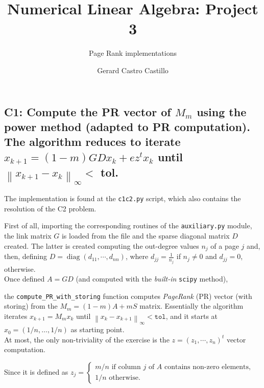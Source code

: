 \documentclass[12pt]{scrartcl}
\begin{document}

\title{Numerical Linear Algebra: Project 3}
\subtitle{Page Rank implementations}
\author{Gerard Castro Castillo}
\maketitle



\subsection*{C1: Compute the PR vector of $M_m$ using the power method (adapted to PR computation). The algorithm reduces to iterate $x_{k+1}=(1-m) G D x_k+e z^t x_k$ until $\left\|x_{k+1}-x_k\right\|_{\infty}<$ tol.}

The implementation is found at the \texttt{c1c2.py} script, which also contains the resolution of the C2 problem.

First of all, importing the corresponding routines of the \texttt{auxiliary.py} module, the link matrix $G$ is loaded from the file and the sparse diagonal matrix $D$ created. The latter is created computing the out-degree values $n_j$ of a page $j$ and, then, defining $D=\operatorname{diag}\left(d_{11}, \cdots, d_{n n}\right)$, where $d_{j j}=\frac{1}{n_j}$ if $n_j \neq 0$ and $d_{j j}=0$, otherwise.\\

Once defined $A=G D$ (and computed with the \textit{built-in} \texttt{scipy} method), 

the \texttt{compute\_{}PR\_{}with\_{}storing} function computes \textit{PageRank} (PR) vector (with storing) from the $M_m = (1 - m) A + m S$ matrix. Essentially the algorithm iterates $ x_{k+1} = M_m x_k $ until $\left\|x_k-x_{k+1}\right\|_{\infty} < \texttt{tol}$, and it starts at $x_0=(1 / n, \ldots, 1 / n)$ as starting point.\\

 At most, the only non-triviality of the exercise is the $z=\left(z_1, \cdots, z_n\right)^t$ vector computation. 
 
 Since it is defined as $
z_j=\left\{\begin{array}{l}
m / n \text { if column } j \text { of } A \text { contains non-zero elements, } \\
1 / n \text { otherwise. }
\end{array}\right.$ 
\end{document}

